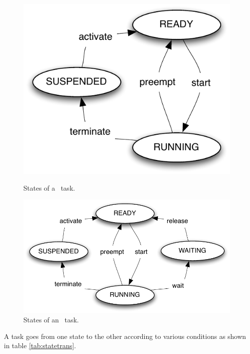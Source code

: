 \begin{figure}[htbp] %
   \centering
   \parbox{.45\linewidth}{%
     \includegraphics[scale=.6]{pictures/statesBasic.pdf} 
     \caption{States of a \BASIC\ task.}%
     \label{fig:basictaskstates}}%
   \begin{minipage}{.55\linewidth}%
     \includegraphics[scale=.6]{pictures/statesExtended.pdf} 
     \caption{States of an \EXTENDED\ task.}%
     \label{fig:extendedtaskstates}%
   \end{minipage}%
\end{figure} 


A task goes from one state to the other according to various conditions as shown in table \ref{tab:statetrans}.

